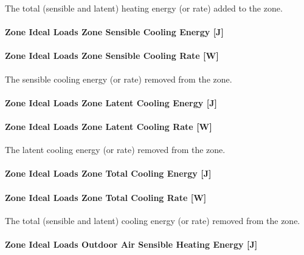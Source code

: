 The total (sensible and latent) heating energy (or rate) added to the zone.

\paragraph{Zone Ideal Loads Zone Sensible Cooling Energy {[}J{]}}\label{zone-ideal-loads-zone-sensible-cooling-energy-j}

\paragraph{Zone Ideal Loads Zone Sensible Cooling Rate {[}W{]}}\label{zone-ideal-loads-zone-sensible-cooling-rate-w}

The sensible cooling energy (or rate) removed from the zone.

\paragraph{Zone Ideal Loads Zone Latent Cooling Energy {[}J{]}}\label{zone-ideal-loads-zone-latent-cooling-energy-j}

\paragraph{Zone Ideal Loads Zone Latent Cooling Rate {[}W{]}}\label{zone-ideal-loads-zone-latent-cooling-rate-w}

The latent cooling energy (or rate) removed from the zone.

\paragraph{Zone Ideal Loads Zone Total Cooling Energy {[}J{]}}\label{zone-ideal-loads-zone-total-cooling-energy-j}

\paragraph{Zone Ideal Loads Zone Total Cooling Rate {[}W{]}}\label{zone-ideal-loads-zone-total-cooling-rate-w}

The total (sensible and latent) cooling energy (or rate) removed from the zone.

\paragraph{Zone Ideal Loads Outdoor Air Sensible Heating Energy {[}J{]}}\label{zone-ideal-loads-outdoor-air-sensible-heating-energy-j}

